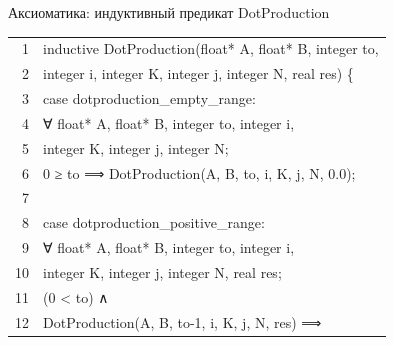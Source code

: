 \documentclass[aspectratio=169, 11pt]{beamer}
\newcommand{\AK}[1]{\textcolor{acslkw}{#1}}   %
\newcommand{\AT}[1]{\textcolor{acslty}{#1}}   %
\newcommand{\AQ}[1]{\textcolor{acslqu}{#1}}   %
\newcommand{\AI}[1]{\textcolor{acslid}{#1}}   %
\newcommand{\AN}[1]{\textcolor{acslnm}{#1}}   %
\newcommand{\AL}[1]{\textcolor{acsllg}{#1}}   %
\begin{document}
\begin{frame}[fragile]{Аксиоматика: индуктивный предикат DotProduction}
	\ttfamily\small
	\setlength{\baselineskip}{1.15em}
	\setlength{\parindent}{0pt}
	
	\begingroup
	\setlength{\fboxsep}{0pt}%
	\colorbox{codebg}{%
		\begin{minipage}{\linewidth}
			\vspace{6pt}%
			\hspace{8pt}%
			\begin{tabular}{@{}r@{\hspace{1.2em}}l@{}}
				\textcolor{ln}{1} & \AK{inductive} \AI{DotProduction}(\AT{float*} \AI{A}, \AT{float*} \AI{B}, \AT{integer} \AI{to}, \\
				\textcolor{ln}{2} & \hspace{2em}\AT{integer} \AI{i}, \AT{integer} \AI{K}, \AT{integer} \AI{j}, \AT{integer} \AI{N}, \AT{real} \AI{res}) \{ \\
				\textcolor{ln}{3} & \hspace{2em}\AK{case} \AI{dotproduction\_empty\_range}: \\
				\textcolor{ln}{4} & \hspace{4em}\AQ{∀} \AT{float*} \AI{A}, \AT{float*} \AI{B}, \AT{integer} \AI{to}, \AT{integer} \AI{i}, \\
				\textcolor{ln}{5} & \hspace{4em}\AT{integer} \AI{K}, \AT{integer} \AI{j}, \AT{integer} \AI{N}; \\
				\textcolor{ln}{6} & \hspace{4em}\AN{0} \AL{≥} \AI{to} \AL{⟹} \AI{DotProduction}(\AI{A}, \AI{B}, \AI{to}, \AI{i}, \AI{K}, \AI{j}, \AI{N}, \AN{0.0}); \\
				\textcolor{ln}{7} & \\
				\textcolor{ln}{8} & \hspace{2em}\AK{case} \AI{dotproduction\_positive\_range}: \\
				\textcolor{ln}{9} & \hspace{4em}\AQ{∀} \AT{float*} \AI{A}, \AT{float*} \AI{B}, \AT{integer} \AI{to}, \AT{integer} \AI{i}, \\
				\textcolor{ln}{10} & \hspace{4em}\AT{integer} \AI{K}, \AT{integer} \AI{j}, \AT{integer} \AI{N}, \AT{real} \AI{res}; \\
				\textcolor{ln}{11} & \hspace{4em}(\AN{0} \AL{<} \AI{to}) \AL{∧} \\
				\textcolor{ln}{12} & \hspace{4em}\AI{DotProduction}(\AI{A}, \AI{B}, \AI{to}\AN{-1}, \AI{i}, \AI{K}, \AI{j}, \AI{N}, \AI{res}) \AL{⟹} \\

\end{tabular}
\end{minipage}}
\end{frame}
\end{document}

